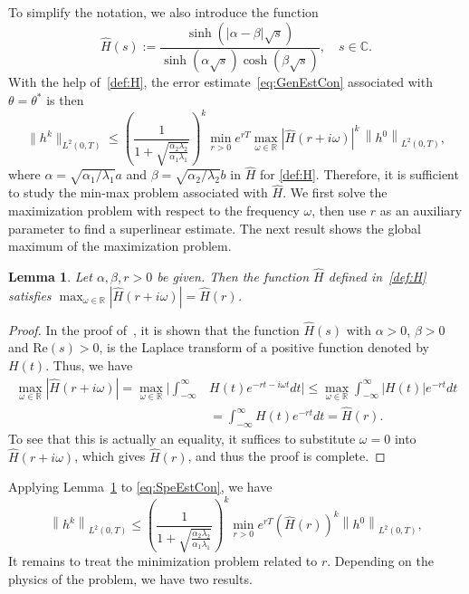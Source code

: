 \documentclass[10pt,a4paper]{amsart}
\newtheorem{lemma}{Lemma}
\newcommand{\norm}[1]{\left\lVert#1\right\rVert}
\begin{document}
To simplify the notation, we also introduce the function \begin{equation}\label{def:H}
	\hat H(s) := \frac{\sinh\left(|\alpha-\beta|\sqrt{s}\right)}{\sinh\left(\alpha\sqrt{s}\right)\cosh\left(\beta\sqrt{s}\right)}, \quad s \in \mathbb{C}.
\end{equation}
With the help of~\eqref{def:H}, the error estimate~\eqref{eq:GenEstCon} associated with $\theta = \theta^*$ is then
\begin{equation}\label{eq:SpeEstCon}
\|h^k\|_{L^2(0, T)} \leq \left(\frac{1}{1+\sqrt{\frac{\alpha_2\lambda_2}{\alpha_1\lambda_1}}}\right)^k  \min_{r > 0} e^{rT}\max_{\omega \in \mathbb{R}} \left|\hat H(r + i \omega)\right|^k \, \norm{h^0}_{L^2(0, T)},
\end{equation}
where $\alpha = \sqrt{\alpha_1/\lambda_1} a$ and $\beta = \sqrt{\alpha_2/\lambda_2} b$ in $\hat H$ for \eqref{def:H}. Therefore, it is sufficient to study the min-max problem associated with $\hat H$. We first solve the maximization problem with respect to the frequency $\omega$, then use $r$ as an auxiliary parameter to find a superlinear estimate. The next result shows the global maximum of the maximization problem.


\begin{lemma}\label{lem:max}
	Let $\alpha, \beta, r>0$ be given. Then the function $\hat H$ defined in~\eqref{def:H} satisfies
	$\max_{\omega \in \mathbb{R}}|\hat H(r + i\omega)| = \hat H(r)$.
\end{lemma}
\begin{proof}
	In the proof of~\cite[Theorem 2]{ma:13}, it is shown that the function $\hat H(s)$ with $\alpha >0$, $\beta > 0$ and $\text{Re}(s)>0$, is the Laplace transform of a positive function denoted by $H(t)$. Thus, we have
\[\begin{aligned}
\max_{\omega \in \mathbb{R}} |\hat{H}(r + i \omega)| =  \max_{\omega \in \mathbb{R}} \Big| \int_{-\infty}^{\infty} &H(t) e^{-r t - i \omega t} dt \Big|
\leq \max_{\omega \in \mathbb{R}} \int_{-\infty}^{\infty} |H(t)|e^{-rt} dt  \\
&= \int_{-\infty}^{\infty} H(t)e^{-rt} dt  = \hat{H}(r).
\end{aligned}\] 
To see that this is actually an equality, it suffices to substitute $\omega = 0$ into $\hat{H}(r + i \omega)$, which gives $\hat{H}(r)$, and thus the proof is complete.
\end{proof}


Applying Lemma~\ref{lem:max} to \eqref{eq:SpeEstCon}, we have
\begin{equation}\label{eq:min-cont}
\norm{h^k}_{L^2(0, T)} \leq \left(\frac{1}{1+\sqrt{\frac{\alpha_2\lambda_2}{\alpha_1\lambda_1}}}\right)^k\min_{r>0}e^{rT} \left(\hat H(r)\right)^k \norm{h^0}_{L^2(0, T)},
\end{equation}
It remains to treat the minimization problem related to $r$. Depending on the physics of the problem, we have two results.
\end{document}
